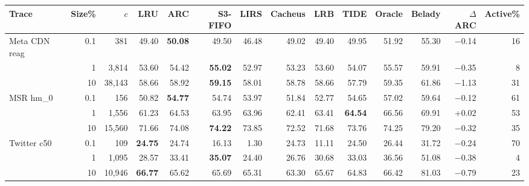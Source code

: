 \begin{tabular}{lrrrrrrrrrrrrr}
\toprule
Trace & Size\% & $c$ & LRU & ARC & S3-FIFO & LIRS & Cacheus & LRB & TIDE & Oracle & Belady & $\Delta$ARC & Active\% \\
\midrule
Meta CDN reag & 0.1 & 381 & 49.40 & \textbf{50.08} & 49.50 & 46.48 & 49.02 & 49.40 & 49.95 & 51.92 & 55.30 & $-$0.14 & 16 \\
 & 1 & 3,814 & 53.60 & 54.42 & \textbf{55.02} & 52.97 & 53.23 & 53.60 & 54.07 & 55.57 & 59.91 & $-$0.35 & 8 \\
 & 10 & 38,143 & 58.66 & 58.92 & \textbf{59.15} & 58.01 & 58.78 & 58.66 & 57.79 & 59.35 & 61.86 & $-$1.13 & 31 \\
\midrule
MSR hm\_0 & 0.1 & 156 & 50.82 & \textbf{54.77} & 54.74 & 53.97 & 51.84 & 52.77 & 54.65 & 57.02 & 59.64 & $-$0.12 & 61 \\
 & 1 & 1,556 & 61.23 & 64.53 & 63.95 & 63.96 & 62.41 & 63.41 & \textbf{64.54} & 66.56 & 69.91 & +0.02 & 53 \\
 & 10 & 15,560 & 71.66 & 74.08 & \textbf{74.22} & 73.85 & 72.52 & 71.68 & 73.76 & 74.25 & 79.20 & $-$0.32 & 35 \\
\midrule
Twitter c50 & 0.1 & 109 & \textbf{24.75} & 24.74 & 16.13 & 1.30 & 24.73 & 11.11 & 24.50 & 26.44 & 31.72 & $-$0.24 & 70 \\
 & 1 & 1,095 & 28.57 & 33.41 & \textbf{35.07} & 24.40 & 26.76 & 30.68 & 33.03 & 36.56 & 51.08 & $-$0.38 & 4 \\
 & 10 & 10,946 & \textbf{66.77} & 65.62 & 65.69 & 65.31 & 63.30 & 65.67 & 64.83 & 66.42 & 81.03 & $-$0.79 & 23 \\
\bottomrule
\end{tabular}
